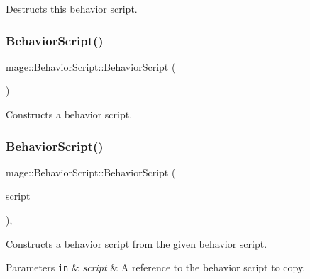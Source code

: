 Destructs this behavior script. \hypertarget{classmage_1_1_behavior_script_ad064a6bbe2ba5f7622d1d20eeec958bf}{}\label{classmage_1_1_behavior_script_ad064a6bbe2ba5f7622d1d20eeec958bf} 
\subsubsection{\texorpdfstring{Behavior\+Script()}{BehaviorScript()}\hspace{0.1cm}{\footnotesize\ttfamily [1/3]}}
{\footnotesize\ttfamily mage\+::\+Behavior\+Script\+::\+Behavior\+Script (\begin{DoxyParamCaption}{ }\end{DoxyParamCaption})\hspace{0.3cm}{\ttfamily [protected]}}

Constructs a behavior script. \hypertarget{classmage_1_1_behavior_script_ab95b988867dfb8592ab7678bff608116}{}\label{classmage_1_1_behavior_script_ab95b988867dfb8592ab7678bff608116} 
\subsubsection{\texorpdfstring{Behavior\+Script()}{BehaviorScript()}\hspace{0.1cm}{\footnotesize\ttfamily [2/3]}}
{\footnotesize\ttfamily mage\+::\+Behavior\+Script\+::\+Behavior\+Script (\begin{DoxyParamCaption}\item[{const \hyperlink{classmage_1_1_behavior_script}{Behavior\+Script} \&}]{script }\end{DoxyParamCaption})\hspace{0.3cm}{\ttfamily [protected]}, {\ttfamily [default]}}

Constructs a behavior script from the given behavior script.


\begin{DoxyParams}[1]{Parameters}
\mbox{\tt in}  & {\em script} & A reference to the behavior script to copy. \\
\hline
\end{DoxyParams}
\hypertarget{classmage_1_1_behavior_script_aa8f509053f6bb9dbfd3baa75bdd8b91e}{}\label{classmage_1_1_behavior_script_aa8f509053f6bb9dbfd3baa75bdd8b91e} 
